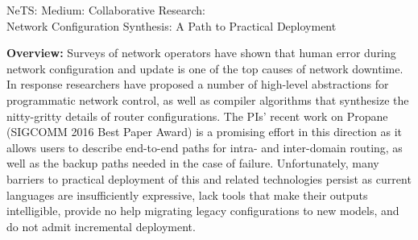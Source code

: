 \documentclass[12pt]{article}
\makeatletter
\newcommand{\Propane}{{\sc Propane}\@\xspace}
\makeatother
\begin{document}
\setcounter{page}{1}

 \begin{large}
\begin{center}
NeTS: Medium: Collaborative Research: \\
Network Configuration Synthesis: A Path to Practical Deployment
\end{center}
\end{large}

\noindent
\textbf{Overview:} 
Surveys of network operators have shown that human error during
network configuration and update is one of the top causes of network
downtime.  
In response researchers have proposed a number of
high-level abstractions for programmatic network control, as well
as compiler algorithms that synthesize the nitty-gritty details
of router configurations.  The PIs' recent work on \Propane 
(SIGCOMM 2016 Best Paper Award) is a promising effort in this direction
as it allows users to describe end-to-end paths for intra- and
inter-domain routing, as well as the backup paths needed in the case of 
failure.  Unfortunately, many barriers to practical deployment of this 
and related technologies persist as current languages are insufficiently
expressive, lack tools that make their outputs intelligible, 
provide no help migrating legacy configurations to new models, and
do not admit incremental deployment.
\end{document}
